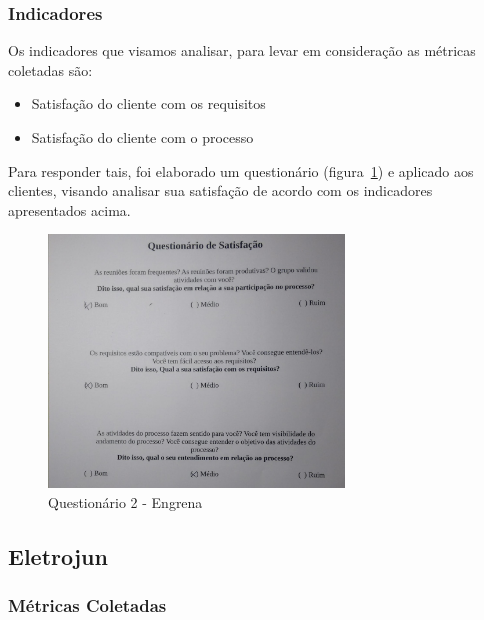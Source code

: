 \subsubsection{Indicadores}

Os indicadores que visamos analisar, para levar em consideração as métricas coletadas são:
\begin{itemize}
\item Satisfação do cliente com os requisitos
\item Satisfação do cliente com o processo
\end{itemize}

Para responder tais, foi elaborado um questionário (figura~\ref{fig:quest3}) e aplicado aos clientes, visando analisar sua satisfação de acordo com os indicadores apresentados acima.

\begin{figure}[H]
  \center
  \includegraphics[width=0.7\textwidth]{figuras/quest3}
  \caption{Questionário 2 - Engrena}
  \label{fig:quest3}
\end{figure}

\subsection{Eletrojun}

\subsubsection{Métricas Coletadas}

